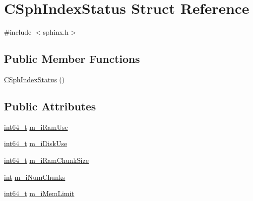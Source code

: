 \hypertarget{structCSphIndexStatus}{\section{C\-Sph\-Index\-Status Struct Reference}
\label{structCSphIndexStatus}
}


{\ttfamily \#include $<$sphinx.\-h$>$}

\subsection*{Public Member Functions}
\begin{DoxyCompactItemize}
\item 
\hyperlink{structCSphIndexStatus_ac307ce9f5b242d0a1afed02949e0f9fb}{C\-Sph\-Index\-Status} ()
\end{DoxyCompactItemize}
\subsection*{Public Attributes}
\begin{DoxyCompactItemize}
\item 
\hyperlink{sphinxstd_8h_a996e72f71b11a5bb8b3b7b6936b1516d}{int64\-\_\-t} \hyperlink{structCSphIndexStatus_a40d35a6139a7c43c4159904d8de8786b}{m\-\_\-i\-Ram\-Use}
\item 
\hyperlink{sphinxstd_8h_a996e72f71b11a5bb8b3b7b6936b1516d}{int64\-\_\-t} \hyperlink{structCSphIndexStatus_a346ad6878d3898277951995f0c34b428}{m\-\_\-i\-Disk\-Use}
\item 
\hyperlink{sphinxstd_8h_a996e72f71b11a5bb8b3b7b6936b1516d}{int64\-\_\-t} \hyperlink{structCSphIndexStatus_add6c2907eaf19e1f9154d7d3b782e321}{m\-\_\-i\-Ram\-Chunk\-Size}
\item 
\hyperlink{sphinxexpr_8cpp_a4a26e8f9cb8b736e0c4cbf4d16de985e}{int} \hyperlink{structCSphIndexStatus_a78ea136b81b6c8ecdf1fd2ff5a0a67a1}{m\-\_\-i\-Num\-Chunks}
\item 
\hyperlink{sphinxstd_8h_a996e72f71b11a5bb8b3b7b6936b1516d}{int64\-\_\-t} \hyperlink{structCSphIndexStatus_acfceb597fb404df8d0a8773b4cd4f3f4}{m\-\_\-i\-Mem\-Limit}
\end{DoxyCompactItemize}


